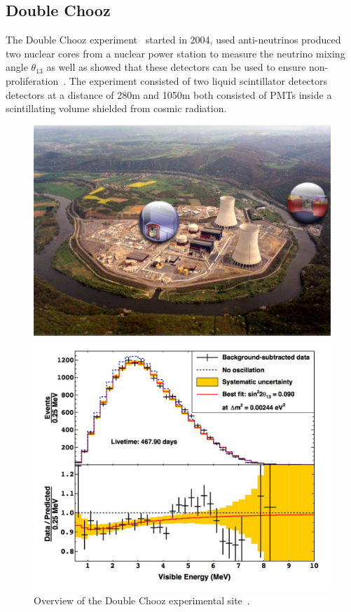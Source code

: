 \subsection{Double Chooz}
The Double Chooz experiment~\cite{45DoubleChooz} started in 2004, used anti-neutrinos produced two nuclear cores from a nuclear power station to measure the neutrino mixing angle $\theta_{13}$ as well as showed that these detectors can be used to ensure non-proliferation~\cite{45DoubleChooz, 66ReactorNP}. The experiment consisted of two liquid scintillator detectors detectors at a distance of 280m and 1050m both consisted of PMTs inside a scintillating volume shielded from cosmic radiation. 

\begin{figure}[h!]
  \centering
  \begin{minipage}[b]{0.49\textwidth}
    \includegraphics[width=\textwidth]{figures/doubleChooz.jpeg}
    \vspace{2mm}
    \caption{Overview of the Double Chooz experimental site~\cite{45DoubleChooz}.}
    \label{fig:dc}
  \end{minipage}
  \hfill
  \begin{minipage}[b]{0.49\textwidth}
    \includegraphics[width=\textwidth]{figures/doubleChooz2.jpeg}

\end{minipage}
\end{figure}
